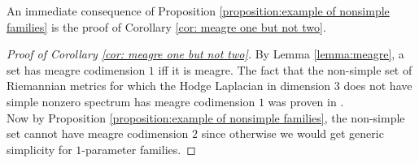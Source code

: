 An immediate consequence of Proposition \ref{proposition:example of nonsimple families} is the proof of Corollary \ref{cor: meagre one but not two}.

\begin{proof}[Proof of Corollary \ref{cor: meagre one but not two}]
    By Lemma \ref{lemma:meagre}, a set has meagre codimension $1$ iff it is meagre. The fact that the non-simple set of Riemannian metrics for which the Hodge Laplacian in dimension $3$ does not have simple nonzero spectrum has meagre codimension $1$ was proven in \cite{Enciso2012}.\\
    Now by Proposition \ref{proposition:example of nonsimple families}, the non-simple set cannot have meagre codimension $2$ since otherwise we would get generic simplicity for $1$-parameter families.
\end{proof}



\printbibliography



